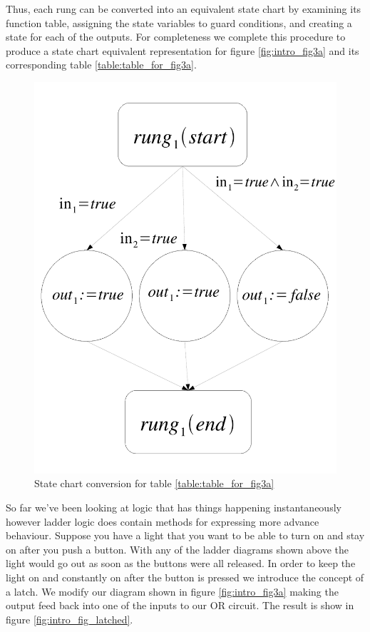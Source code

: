 Thus, each rung can be converted into an equivalent state chart by examining its 
function table, assigning the state variables to guard conditions, and creating a
state for each of the outputs. For completeness we complete this procedure to produce
a state chart equivalent representation for figure \ref{fig:intro_fig3a} and its
corresponding table \ref{table:table_for_fig3a}.


\begin{figure}[htp]
    \centering
    \includegraphics[width=\imgmedsmall]{./images/intro_or_graph_3a.pdf} %
    \caption{State chart conversion for table \ref{table:table_for_fig3a}}
    \label{fig:intro_or_graph_3a}
\end{figure}

So far we've been looking at logic that has things happening instantaneously however ladder logic does contain methods for expressing more advance behaviour. Suppose you have a light that you want to be able to turn on and stay on after you push a button. With any of the ladder diagrams shown above the light would go out as soon as the buttons were all released. In order to keep the light on and constantly on after the button is pressed we introduce the concept of a latch. We modify our diagram shown in figure \ref{fig:intro_fig3a} making the output feed back into one of the inputs to our OR circuit. The result is show in figure \ref{fig:intro_fig_latched}.

